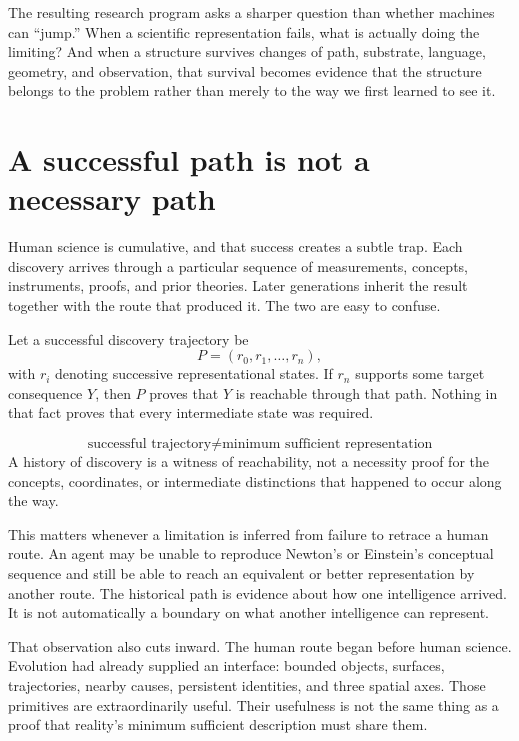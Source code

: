 \documentclass[11pt]{article}
\begin{document}
The resulting research program asks a sharper question than whether machines can ``jump.'' When a scientific representation fails, what is actually doing the limiting? And when a structure survives changes of path, substrate, language, geometry, and observation, that survival becomes evidence that the structure belongs to the problem rather than merely to the way we first learned to see it.

\section{A successful path is not a necessary path}
Human science is cumulative, and that success creates a subtle trap. Each discovery arrives through a particular sequence of measurements, concepts, instruments, proofs, and prior theories. Later generations inherit the result together with the route that produced it. The two are easy to confuse.

Let a successful discovery trajectory be
\[
P=(r_0,r_1,\ldots,r_n),
\]
with $r_i$ denoting successive representational states. If $r_n$ supports some target consequence $Y$, then $P$ proves that $Y$ is reachable through that path. Nothing in that fact proves that every intermediate state was required.

\begin{keybox}
\[
\boxed{\text{successful trajectory}\neq\text{minimum sufficient representation}}
\]
A history of discovery is a witness of reachability, not a necessity proof for the concepts, coordinates, or intermediate distinctions that happened to occur along the way.
\end{keybox}

This matters whenever a limitation is inferred from failure to retrace a human route. An agent may be unable to reproduce Newton's or Einstein's conceptual sequence and still be able to reach an equivalent or better representation by another route. The historical path is evidence about how one intelligence arrived. It is not automatically a boundary on what another intelligence can represent.

That observation also cuts inward. The human route began before human science. Evolution had already supplied an interface: bounded objects, surfaces, trajectories, nearby causes, persistent identities, and three spatial axes. Those primitives are extraordinarily useful. Their usefulness is not the same thing as a proof that reality's minimum sufficient description must share them.
\end{document}
